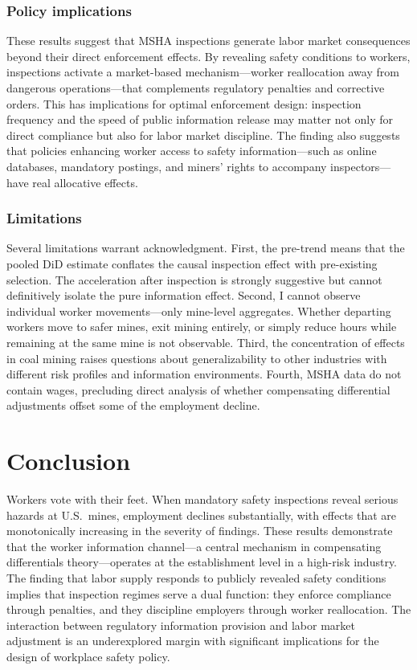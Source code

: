 \documentclass[12pt]{article}
\begin{document}
\subsubsection*{Policy implications} These results suggest that MSHA inspections generate labor market consequences beyond their direct enforcement effects. By revealing safety conditions to workers, inspections activate a market-based mechanism---worker reallocation away from dangerous operations---that complements regulatory penalties and corrective orders. This has implications for optimal enforcement design: inspection frequency and the speed of public information release may matter not only for direct compliance but also for labor market discipline. The finding also suggests that policies enhancing worker access to safety information---such as online databases, mandatory postings, and miners' rights to accompany inspectors---have real allocative effects.

\subsubsection*{Limitations} Several limitations warrant acknowledgment. First, the pre-trend means that the pooled DiD estimate conflates the causal inspection effect with pre-existing selection. The acceleration after inspection is strongly suggestive but cannot definitively isolate the pure information effect. Second, I cannot observe individual worker movements---only mine-level aggregates. Whether departing workers move to safer mines, exit mining entirely, or simply reduce hours while remaining at the same mine is not observable. Third, the concentration of effects in coal mining raises questions about generalizability to other industries with different risk profiles and information environments. Fourth, MSHA data do not contain wages, precluding direct analysis of whether compensating differential adjustments offset some of the employment decline.


\section{Conclusion}

Workers vote with their feet. When mandatory safety inspections reveal serious hazards at U.S.\ mines, employment declines substantially, with effects that are monotonically increasing in the severity of findings. These results demonstrate that the worker information channel---a central mechanism in compensating differentials theory---operates at the establishment level in a high-risk industry. The finding that labor supply responds to publicly revealed safety conditions implies that inspection regimes serve a dual function: they enforce compliance through penalties, and they discipline employers through worker reallocation. The interaction between regulatory information provision and labor market adjustment is an underexplored margin with significant implications for the design of workplace safety policy.
\end{document}

